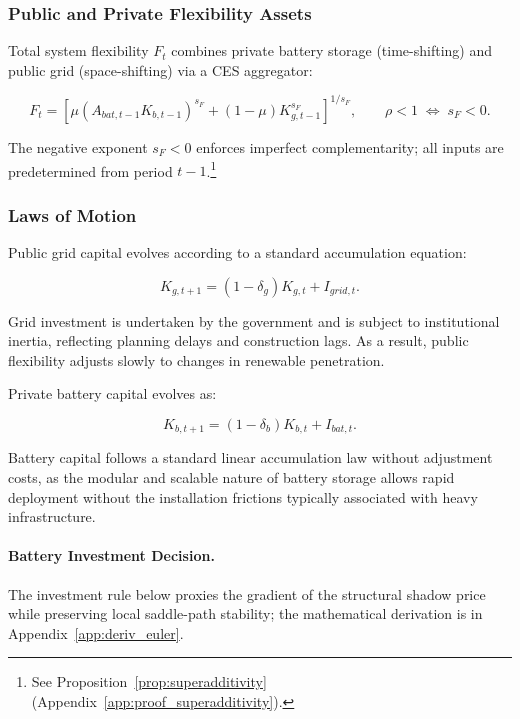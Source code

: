 	\subsubsection{Public and Private Flexibility Assets}
	
	Total system flexibility $F_t$ combines private battery storage (time-shifting) and public grid (space-shifting) via a CES aggregator:

	\begin{equation}
		F_t =
		\left[
		\mu (A_{bat,t-1} K_{b,t-1})^{s_F}
		+
		(1-\mu) K_{g,t-1}^{s_F}
		\right]^{1/s_F},
		\qquad \rho < 1 \;\Leftrightarrow\; s_F < 0
		\label{eq:flexibility_bundle}.
	\end{equation}
	
	The negative exponent $s_F<0$ enforces imperfect complementarity; all inputs are predetermined from period $t-1$.\footnote{See Proposition~\ref{prop:superadditivity} (Appendix~\ref{app:proof_superadditivity}).}
	
	\subsubsection{Laws of Motion}
	
	Public grid capital evolves according to a standard accumulation equation:
	
	\begin{equation}
		K_{g,t+1} = (1-\delta_g)K_{g,t} + I_{grid,t}
		\label{eq:grid_capital}.
	\end{equation}
	
	Grid investment is undertaken by the government and is subject to institutional inertia, reflecting planning delays and construction lags. As a result, public flexibility adjusts slowly to changes in renewable penetration.
	
	Private battery capital evolves as:
	
	\begin{equation}
		K_{b,t+1} = (1-\delta_b)K_{b,t} + I_{bat,t}
		\label{eq:battery_capital}.
	\end{equation}
	
	Battery capital follows a standard linear accumulation law without adjustment costs, as the modular and scalable nature of battery storage allows rapid deployment without the installation frictions typically associated with heavy infrastructure.
	
	\paragraph{Battery Investment Decision.}
	The investment rule below proxies the gradient of the structural shadow price while preserving local saddle-path stability; the mathematical derivation is in Appendix~\ref{app:deriv_euler}.

